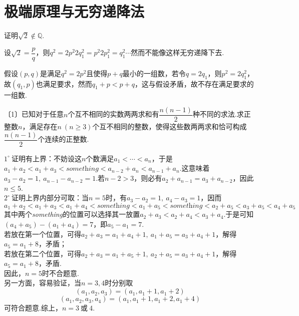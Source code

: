 \documentclass[lang=cn, zihao=4.5]{elegantbook}
\newcommand{\nd}[1]{〔#1〕}
\newcommand{\buzhou}[1]{$#1^{\circ} \ $}
\begin{document}
\section{极端原理与无穷递降法}

\begin{instance}
	证明$\sqrt{2} \notin \mathbb{Q}$.
\end{instance}
\begin{solution}
	\begin{guess}
		设$\sqrt{2}=\dfrac{p}{q}$，则$q^2=2p^2$$2q_1^2=p^2$$2p_1^2=q_1^2 \cdots$然而不能像这样无穷递降下去.
	\end{guess}
	假设$(p,q)$是满足$q^2=2p^2$且使得$p+q$最小的一组数，若令$q=2q_1$，则$p^2=2q_1^2$，故$(q_1,p)$也满足要求，然而$q_1+p<p+q$，这与假设矛盾，故不存在满足要求的一组数.
\end{solution}

\begin{example} %
	\nd{1}已知对于任意$n$个互不相同的实数两两求和有$\dfrac{n(n-1)}{2}$种不同的求法.求正整数$n$，满足存在$n~(n \geq 3)$个互不相同的整数，使得这些数两两求和恰可构成$\dfrac{n(n-1)}{2}$个连续的正整数.
\end{example}
\begin{solution}
	\buzhou{1}证明有上界：不妨设这$n$个数满足$a_1< \cdots <a_n$，于是$a_1+a_2<a_1+a_3< \textit{something} <a_{n-2}+a_n<a_{n-1}+a_n$.这意味着$a_3-a_2=1,~a_{n-1}-a_{n-2}=1$.若$n-2>3$，则必有$a_2+a_{n-1} = a_3+a_{n-2}$，因此$n \leq 5$. \\
	\buzhou{2}证明上界内部分可取：当$n=5$时，有$a_3-a_2=1,~a_4-a_3=1$，因而$$a_1+a_2 < a_1+a_3 < a_1+a_4 < \textit{something} < a_1+a_5 < \textit{something} <a_2+a_5 < a_3+a_5 < a_4+a_5$$
	其中两个\textit{something}的位置可以选择其一放置$a_2+a_3 < a_2+a_4 < a_3+a_4$.于是可知$(a_4+a_5) - (a_1+a_4)=7$，即$a_5-a_1=7$. \\
	若放在第一个位置，可得$a_2+a_3=a_1+a_4+1,~a_1+a_5=a_3+a_4+1$，解得$a_5=a_1+8$，矛盾； \\
	若放在第二个位置，可得$a_2+a_3=a_1+a_5+1,~a_2+a_5=a_3+a_4+1$，解得$a_5=a_1+8$，矛盾. \\
	因此，$n=5$时不合题意. \\
	另一方面，容易验证，当$n=3,4$时分别取
	$$(a_1,a_2,a_3) = (a_1,a_1+1,a_1+2)$$
	$$(a_1,a_2,a_3,a_4) = (a_1,a_1+1,a_1+2,a_1+4)$$
	可符合题意.综上，$n=3~ \textit{或} ~4$.
\end{solution}
\end{document}
